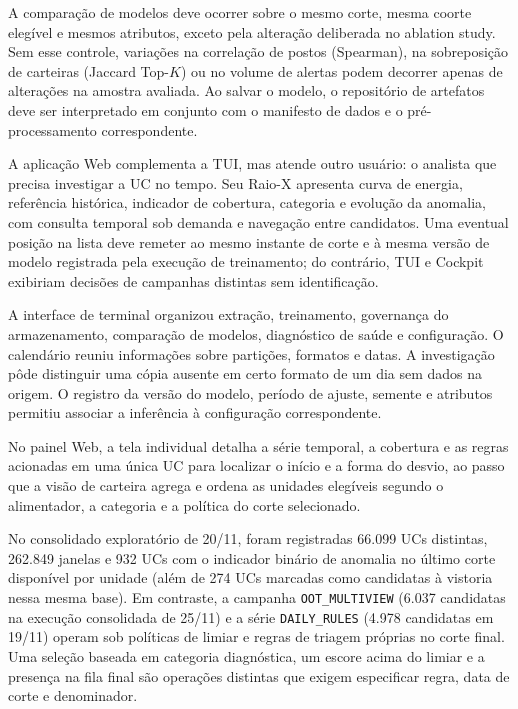 A comparação de modelos deve ocorrer sobre o mesmo corte, mesma coorte elegível e mesmos atributos, exceto pela alteração deliberada no ablation study. Sem esse controle, variações na correlação de postos (Spearman), na sobreposição de carteiras (Jaccard Top-$K$) ou no volume de alertas podem decorrer apenas de alterações na amostra avaliada. Ao salvar o modelo, o repositório de artefatos deve ser interpretado em conjunto com o manifesto de dados e o pré-processamento correspondente.

A aplicação Web complementa a TUI, mas atende outro usuário: o analista que precisa investigar a UC no tempo. Seu Raio-X apresenta curva de energia, referência histórica, indicador de cobertura, categoria e evolução da anomalia, com consulta temporal sob demanda e navegação entre candidatos. Uma eventual posição na lista deve remeter ao mesmo instante de corte e à mesma versão de modelo registrada pela execução de treinamento; do contrário, TUI e Cockpit exibiriam decisões de campanhas distintas sem identificação.


A interface de terminal organizou extração, treinamento, governança do armazenamento, comparação de modelos, diagnóstico de saúde e configuração. O calendário reuniu informações sobre partições, formatos e datas. A investigação pôde distinguir uma cópia ausente em certo formato de um dia sem dados na origem. O registro da versão do modelo, período de ajuste, semente e atributos permitiu associar a inferência à configuração correspondente.

No painel Web, a tela individual detalha a série temporal, a cobertura e as regras acionadas em uma única UC para localizar o início e a forma do desvio, ao passo que a visão de carteira agrega e ordena as unidades elegíveis segundo o alimentador, a categoria e a política do corte selecionado.

No consolidado exploratório de 20/11, foram registradas 66.099 UCs distintas, 262.849 janelas e 932 UCs com o indicador binário de anomalia no último corte disponível por unidade (além de 274 UCs marcadas como candidatas à vistoria nessa mesma base). Em contraste, a campanha \texttt{OOT\_MULTIVIEW} (6.037 candidatas na execução consolidada de 25/11) e a série \texttt{DAILY\_RULES} (4.978 candidatas em 19/11) operam sob políticas de limiar e regras de triagem próprias no corte final. Uma seleção baseada em categoria diagnóstica, um escore acima do limiar e a presença na fila final são operações distintas que exigem especificar regra, data de corte e denominador.






